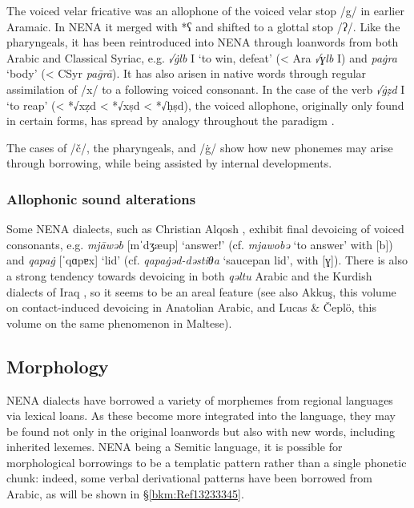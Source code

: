 \documentclass[output=paper]{langsci/langscibook}
\begin{document}
The voiced velar fricative was an allophone of the voiced velar stop /g/ in earlier Aramaic. In NENA it merged with *ʕ and shifted to a glottal stop /ʔ/. Like the pharyngeals, it has been reintroduced into NENA through loanwords from both Arabic and Classical Syriac, e.g. \textit{√\.glb} I ‘to win, defeat’ (< Ara \textit{√ɣlb} I) and \textit{pa\.gra} ‘body’ (< CSyr \textit{pa\={g}rā}). It has also arisen in native words through regular assimilation of /x/ to a following voiced consonant. In the case of the verb \textit{√\.gẓd} I ‘to reap’ (< *√xẓd < *√xṣd  < *√ḥṣd), the voiced allophone, originally only found in certain forms, has spread by analogy throughout the paradigm \citep[20]{Coghill2004}.

The cases of /č/, the pharyngeals, and /\.g/ show how new phonemes may arise through borrowing, while being assisted by internal developments.

\subsubsection{Allophonic sound alterations}

Some NENA dialects, such as Christian Alqosh \citep[27]{Coghill2004}, exhibit final devoicing of voiced consonants, e.g. \textit{mjāwəb} [mˈdʒæup] ‘answer!’ (cf. \textit{mjawobə} ‘to answer’ with [b]) and \textit{qapa\.g} [ˈqɑpɐx] ‘lid’ (cf. \textit{qapa\.gəd-dəstiθa} ‘saucepan lid’, with [ɣ]). There is also a strong tendency towards devoicing in both \textit{qəltu} Arabic \citep[98]{Jastrow1978} and the Kurdish dialects of Iraq \citep[49]{MacKenzie1961}, so it seems to be an areal feature (see also Akkuş, this volume on contact-induced devoicing in Anatolian Arabic, and Lucas \& Čeplö, this volume on the same phenomenon in Maltese).

\subsection{Morphology}

NENA dialects have borrowed a variety of morphemes from regional languages via lexical loans. As these become more integrated into the language, they may be found not only in the original loanwords but also with new words, including inherited lexemes. NENA being a Semitic language, it is possible for morphological borrowings to be a templatic pattern rather than a single phonetic chunk: indeed, some verbal derivational patterns have been borrowed from Arabic, as will be shown in §\ref{bkm:Ref13233345}.
\end{document}
